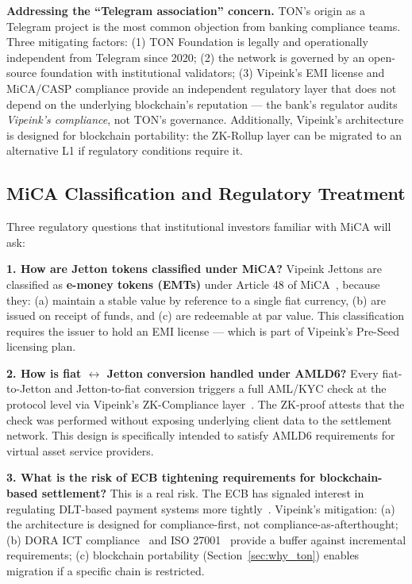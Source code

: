 \documentclass[11pt,a4paper]{article}
\begin{document}
\noindent\textbf{Addressing the ``Telegram association'' concern.} TON's origin as a Telegram project is the most common objection from banking compliance teams. Three mitigating factors: (1) TON Foundation is legally and operationally independent from Telegram since 2020; (2) the network is governed by an open-source foundation with institutional validators; (3) Vipeink's EMI license and MiCA/CASP compliance provide an independent regulatory layer that does not depend on the underlying blockchain's reputation --- the bank's regulator audits \textit{Vipeink's compliance}, not TON's governance. Additionally, Vipeink's architecture is designed for blockchain portability: the ZK-Rollup layer can be migrated to an alternative L1 if regulatory conditions require it.

\subsection*{MiCA Classification and Regulatory Treatment}
\label{sec:mica_classification}

Three regulatory questions that institutional investors familiar with MiCA will ask:

\textbf{1. How are Jetton tokens classified under MiCA?} Vipeink Jettons are classified as \textbf{e-money tokens (EMTs)} under Article 48 of MiCA~\cite{mica_reg}, because they: (a) maintain a stable value by reference to a single fiat currency, (b) are issued on receipt of funds, and (c) are redeemable at par value. This classification requires the issuer to hold an EMI license --- which is part of Vipeink's Pre-Seed licensing plan.

\textbf{2. How is fiat $\leftrightarrow$ Jetton conversion handled under AMLD6?} Every fiat-to-Jetton and Jetton-to-fiat conversion triggers a full AML/KYC check at the protocol level via Vipeink's ZK-Compliance layer~\cite{fatf_aml_tech,amld6}. The ZK-proof attests that the check was performed without exposing underlying client data to the settlement network. This design is specifically intended to satisfy AMLD6 requirements for virtual asset service providers.

\textbf{3. What is the risk of ECB tightening requirements for blockchain-based settlement?} This is a real risk. The ECB has signaled interest in regulating DLT-based payment systems more tightly~\cite{ecb_payments}. Vipeink's mitigation: (a) the architecture is designed for compliance-first, not compliance-as-afterthought; (b) DORA ICT compliance~\cite{dora_reg} and ISO 27001~\cite{iso27001} provide a buffer against incremental requirements; (c) blockchain portability (Section~\ref{sec:why_ton}) enables migration if a specific chain is restricted.
\end{document}
